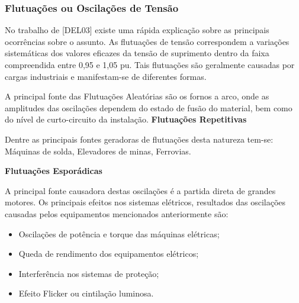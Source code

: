\subsubsection{Flutuações ou Oscilações de Tensão}
\par
No trabalho de [DEL03] existe uma rápida explicação sobre as principais ocorrências sobre o assunto. As flutuações de tensão correspondem a variações sistemáticas dos valores eficazes da tensão de suprimento dentro da faixa compreendida entre 0,95 e 1,05 pu. Tais flutuações são geralmente causadas por cargas industriais e manifestam-se de diferentes formas.
\par
A principal fonte das Flutuações Aleatórias são os fornos a arco, onde as amplitudes das oscilações dependem do estado de fusão do material, bem como do nível de curto-circuito da instalação.
\textbf{Flutuações Repetitivas}
\par Dentre as principais fontes geradoras de flutuações desta natureza tem-se: Máquinas de solda, Elevadores de minas, Ferrovias.
\par\textbf{Flutuações Esporádicas}
\par A principal fonte causadora destas oscilações é a partida direta de grandes motores. Os principais efeitos nos sistemas elétricos, resultados das oscilações causadas pelos equipamentos mencionados anteriormente são:
\begin{itemize}
\item Oscilações de potência e torque das máquinas elétricas;
\item Queda de rendimento dos equipamentos elétricos;
\item Interferência nos sistemas de proteção;
\item Efeito Flicker ou cintilação luminosa.
\end{itemize}

